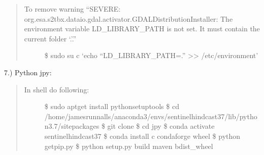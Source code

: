 \documentclass[letterpaper,10pt,english]{sphinxmanual}
\begin{document}
\begin{quote}
\begin{description}
\item[{To remove warning “SEVERE: org.esa.s2tbx.dataio.gdal.activator.GDALDistributionInstaller: The environment variable LD\_LIBRARY\_PATH is not set. It must contain the current folder ‘.’.”}] \leavevmode
\$ sudo su \sphinxhyphen{}c ‘echo “LD\_LIBRARY\_PATH=.” \textgreater{}\textgreater{} /etc/environment’

\end{description}
\end{quote}

7.) Python \sphinxhyphen{} jpy: 
\begin{quote}
\begin{description}
\item[{In shell do following:}] \leavevmode
\$ sudo apt\sphinxhyphen{}get install python\sphinxhyphen{}setuptools
\$ cd /home/jamesrunnalls/anaconda3/envs/sentinel\sphinxhyphen{}hindcast\sphinxhyphen{}37/lib/python3.7/site\sphinxhyphen{}packages
\$ git clone 
\$ cd jpy
\$ conda activate sentinel\sphinxhyphen{}hindcast\sphinxhyphen{}37
\$ conda install \sphinxhyphen{}c conda\sphinxhyphen{}forge wheel
\$ python get\sphinxhyphen{}pip.py
\$ python setup.py build maven bdist\_wheel

\end{description}
\end{quote}
\end{document}
